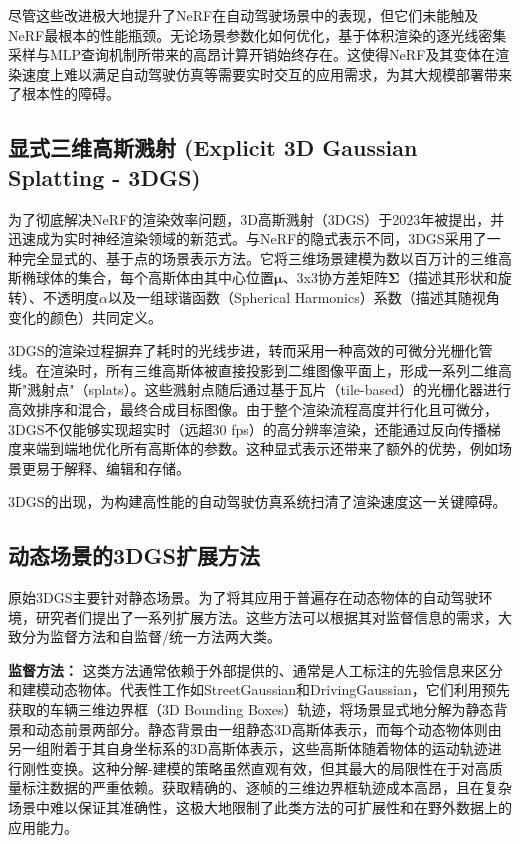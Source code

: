 尽管这些改进极大地提升了NeRF在自动驾驶场景中的表现，但它们未能触及NeRF最根本的性能瓶颈。无论场景参数化如何优化，基于体积渲染的逐光线密集采样与MLP查询机制所带来的高昂计算开销始终存在。这使得NeRF及其变体在渲染速度上难以满足自动驾驶仿真等需要实时交互的应用需求，为其大规模部署带来了根本性的障碍\cite{chen2025snerf}。

\subsection{显式三维高斯溅射 (Explicit 3D Gaussian Splatting - 3DGS)}

为了彻底解决NeRF的渲染效率问题，3D高斯溅射（3DGS）于2023年被提出，并迅速成为实时神经渲染领域的新范式\cite{kerbl2023gaussian}。与NeRF的隐式表示不同，3DGS采用了一种完全显式的、基于点的场景表示方法。它将三维场景建模为数以百万计的三维高斯椭球体的集合，每个高斯体由其中心位置$\mathbf{\mu}$、3x3协方差矩阵$\mathbf{\Sigma}$（描述其形状和旋转）、不透明度$\alpha$以及一组球谐函数（Spherical Harmonics）系数（描述其随视角变化的颜色）共同定义\cite{kerbl2023gaussian}。

3DGS的渲染过程摒弃了耗时的光线步进，转而采用一种高效的可微分光栅化管线。在渲染时，所有三维高斯体被直接投影到二维图像平面上，形成一系列二维高斯"溅射点"（splats）。这些溅射点随后通过基于瓦片（tile-based）的光栅化器进行高效排序和混合，最终合成目标图像。由于整个渲染流程高度并行化且可微分，3DGS不仅能够实现超实时（远超30 fps）的高分辨率渲染，还能通过反向传播梯度来端到端地优化所有高斯体的参数\cite{kerbl2023gaussian}。这种显式表示还带来了额外的优势，例如场景更易于解释、编辑和存储\cite{kerbl2023gaussian}。

3DGS的出现，为构建高性能的自动驾驶仿真系统扫清了渲染速度这一关键障碍。

\subsection{动态场景的3DGS扩展方法}

原始3DGS主要针对静态场景。为了将其应用于普遍存在动态物体的自动驾驶环境，研究者们提出了一系列扩展方法。这些方法可以根据其对监督信息的需求，大致分为监督方法和自监督/统一方法两大类。

\textbf{监督方法：} 这类方法通常依赖于外部提供的、通常是人工标注的先验信息来区分和建模动态物体。代表性工作如StreetGaussian和DrivingGaussian，它们利用预先获取的车辆三维边界框（3D Bounding Boxes）轨迹，将场景显式地分解为静态背景和动态前景两部分\cite{lin2024drivinggaussian}。静态背景由一组静态3D高斯体表示，而每个动态物体则由另一组附着于其自身坐标系的3D高斯体表示，这些高斯体随着物体的运动轨迹进行刚性变换。这种分解-建模的策略虽然直观有效，但其最大的局限性在于对高质量标注数据的严重依赖。获取精确的、逐帧的三维边界框轨迹成本高昂，且在复杂场景中难以保证其准确性，这极大地限制了此类方法的可扩展性和在野外数据上的应用能力\cite{sun2025splatflow}。


